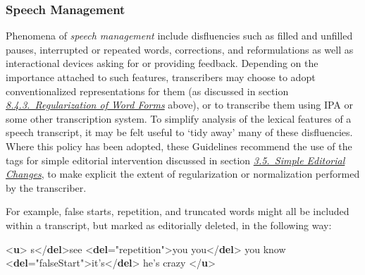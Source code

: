 \subsubsection[{Speech Management}]{Speech Management}\label{TSTPSM}\par
Phenomena of \textit{speech management} include disfluencies such as filled and unfilled pauses, interrupted or repeated words, corrections, and reformulations as well as interactional devices asking for or providing feedback. Depending on the importance attached to such features, transcribers may choose to adopt conventionalized representations for them (as discussed in section \textit{\hyperref[TSREG]{8.4.3.\ Regularization of Word Forms}} above), or to transcribe them using IPA or some other transcription system. To simplify analysis of the lexical features of a speech transcript, it may be felt useful to ‘tidy away’ many of these disfluencies. Where this policy has been adopted, these Guidelines recommend the use of the tags for simple editorial intervention discussed in section \textit{\hyperref[COED]{3.5.\ Simple Editorial Changes}}, to make explicit the extent of regularization or normalization performed by the transcriber.\par
For example, false starts, repetition, and truncated words might all be included within a transcript, but marked as editorially deleted, in the following way: \par\bgroup{}\exampleFont \begin{shaded}\noindent\mbox{}{<\textbf{u}>}\mbox{}\newline 
{}s{</\textbf{del}>}see\mbox{}\newline 
{<\textbf{del}\hspace*{1em}{type}="{repetition}">}you you{</\textbf{del}>} you know\mbox{}\newline 
{<\textbf{del}\hspace*{1em}{type}="{falseStart}">}it's{</\textbf{del}>} he's crazy\mbox{}\newline 
{</\textbf{u}>}\end{shaded}\egroup\par \par
